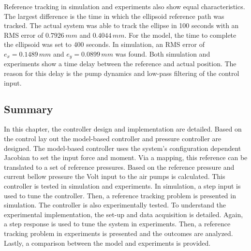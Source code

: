 Reference tracking in simulation and experiments also show equal characteristics. The largest difference is the time in which the ellipsoid reference path was tracked. The actual system was able to track the ellipse in 100 seconds with an RMS error of $0.7926 \hspace{2pt} mm$ and $0.4044 \hspace{2pt} mm$. For the model, the time to complete the ellipsoid was set to 400 seconds. In simulation, an RMS error of $e_x = 0.1489  \hspace{2pt} mm$ and $e_y = 0.0899 \hspace{2pt} mm$ was found. Both simulation and experiments show a time delay between the reference and actual position. The reason for this delay is the pump dynamics and low-pass filtering of the control input.


\subsection*{Summary}


In this chapter, the controller design and implementation are detailed. Based on the control lay out the model-based controller and pressure controller are designed. The model-based controller uses the system's configuration dependent Jacobian to set the input force and moment. Via a mapping, this reference can be translated to a set of reference pressures. Based on the reference pressure and current bellow pressure the Volt input to the air pumps is calculated. This controller is tested in simulation and experiments. In simulation, a step input is used to tune the controller. Then, a reference tracking problem is presented in simulation. The controller is also experimentally tested. To understand the experimental implementation, the set-up and data acquisition is detailed. Again, a step response is used to tune the system in experiments. Then, a reference tracking problem in experiments is presented and the outcomes are analyzed. Lastly, a comparison between the model and experiments is provided. 



























